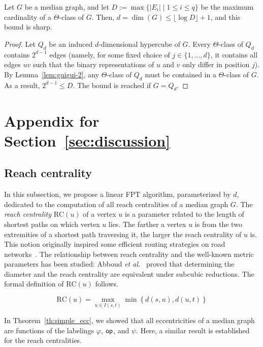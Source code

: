 \documentclass[a4paper,UKenglish,numberwithinsect,cleveref, autoref,anonymous]{lipics-v2021}
\newcommand{\set}[1]{\left\{ #1 \right\}}
\newcommand{\opp}{\mbox{\textsf{op}}}
\newcommand{\rc}{\mbox{RC}}
\begin{document}
\begin{lemma}\label{lem:guigui-3}
Let $G$ be a median graph, and let $D := \max\{ |E_i| \mid 1 \leq i \leq q\}$ be the maximum cardinality of a $\Theta$-class of $G$. Then, $d = \dim(G) \leq \lfloor\log{D}\rfloor + 1$, and this bound is sharp.
\end{lemma}
\begin{proof}
Let $Q_d$ be an induced $d$-dimensional hypercube of $G$.
Every $\Theta$-class of $Q_d$ contains $2^{d-1}$ edges (namely, for some fixed choice of $j \in \{1,\ldots,d\}$, it contains all edges $uv$ such that the binary representations of $u$ and $v$ only differ in position $j$).
By Lemma~\ref{lem:guigui-2}, any $\Theta$-class of $Q_d$ must be contained in a $\Theta$-class of $G$.
As a result, $2^{d-1} \leq D$.
The bound is reached if $G = Q_d$.
\end{proof}

\section{Appendix for Section~\ref{sec:discussion}} \label{asec:discussion}

\subsection{Reach centrality} \label{asubsec:reach_centrality}

In this subsection, we propose a linear FPT algorithm, parameterized by $d$, dedicated to the computation of all reach centralities of a median graph $G$. The \textit{reach centrality} $\rc(u)$ of a vertex $u$ is a parameter related to the length of shortest paths on which vertex $u$ lies. The farther a vertex $u$ is from the two extremities of a shortest path traversing it, the larger the reach centrality of $u$ is. This notion originally inspired some efficient routing strategies on road networks~\cite{Gu04}. The relationship between reach centrality and the well-known metric parameters has been studied: Abboud {\em et al.}~\cite{AbGrWi15} proved that determining the diameter and the reach centrality are equivalent under subcubic reductions. The formal definition of $\rc(u)$ follows.

\begin{equation}
\rc(u) = \max_{u \in I(s,t)} \min \set{d(s,u),d(u,t)}
\label{eq:reach_centrality}
\end{equation}

In Theorem~\ref{th:simple_ecc}, we showed that all eccentricities of a median graph are functions of the labelings $\varphi$, $\opp$, and $\psi$. Here, a similar result is established for the reach centralities.
\end{document}
